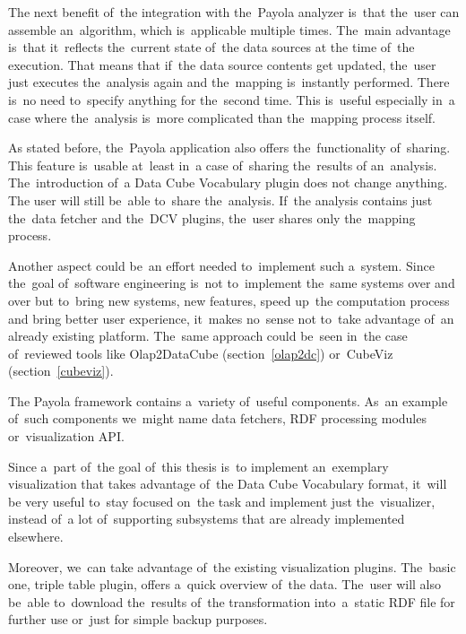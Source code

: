 The next benefit of~the integration with the~Payola analyzer is~that the~user 
can assemble an~algorithm, which is~applicable multiple times. The~main 
advantage is~that it~reflects the~current state of~the data sources at
the time of~the execution. That means that if~the data source contents get 
updated, the~user just executes the~analysis again and the~mapping is~instantly 
performed. There is~no need to~specify anything for the~second time.
This is~useful especially in~a case where the~analysis is~more complicated than the~mapping process itself.

As stated before, the~Payola application also offers the~functionality of~sharing. This feature is~usable at~least in~a case of~sharing the~results 
of an~analysis. The~introduction of~a Data Cube Vocabulary plugin does not change anything.
The user will still be~able to~share the~analysis. If~the analysis contains just the~data fetcher 
and the~DCV plugins, the~user shares only the~mapping process.

Another aspect could be~an effort needed to~implement such a~system. Since the~goal of~software engineering is~not to~implement the~same systems over and over 
but to~bring new systems, new features, speed up~the computation process and 
bring better user experience, it~makes no~sense not to~take advantage of~an already existing platform. The~same approach could be~seen in~the case of~reviewed 
tools like Olap2DataCube (section~\ref{olap2dc}) or~CubeViz 
(section~\ref{cubeviz}).

The Payola framework contains a~variety of~useful components. As~an example of~such components we~might name data fetchers, RDF processing modules or~visualization API.

Since a~part of~the goal of~this thesis is~to implement an~exemplary 
visualization that takes advantage of~the Data Cube Vocabulary format, it~will 
be very useful to~stay focused on~the task and implement just the~visualizer, 
instead of~a lot of~supporting subsystems that are already 
implemented elsewhere.

Moreover, we~can take advantage of~the existing visualization plugins. The~basic 
one, triple table plugin, offers a~quick overview of~the data. The~user 
will also be~able to~download the~results of~the transformation into~a~static 
RDF file for further use or~just for simple backup purposes.


